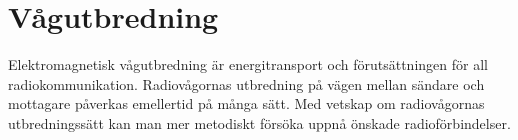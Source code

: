 \chapter{Vågutbredning}
\label{ch:vaagutbredning}

Elektromagnetisk vågutbredning är energitransport och förutsättningen för all
radiokommunikation.
Radiovågornas utbredning på vägen mellan sändare och mottagare påverkas
emellertid på många sätt.
Med vetskap om radiovågornas utbredningssätt kan man mer metodiskt försöka uppnå
önskade radioförbindelser.
